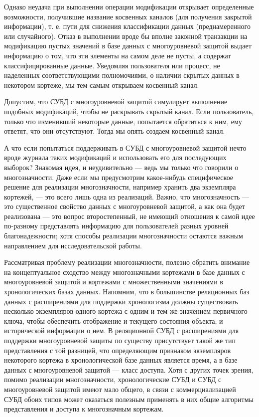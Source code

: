Однако неудача при выполнении операции модификации открывает определенные возможности, получившие название косвенных каналов (для получения закрытой информации), т. е. пути для снижения классификации данных (преднамеренного или случайного). Отказ в выполнении вроде бы вполне законной транзакции на модификацию пустых значений в базе данных с многоуровневой защитой выдает информацию о том, что эти элементы на самом деле не пусты, а содержат классифицированные данные. Уведомляя пользователя или процесс, не наделенных соответствующими полномочиями, о наличии скрытых данных в некотором кортеже, мы тем самым открываем косвенный канал.

Допустим, что СУБД с многоуровневой защитой симулирует выполнение подобных модификаций, чтобы не раскрывать скрытый канал. Если пользователь, только что изменивший некоторые данные, попытается обратиться к ним, ему ответят, что они отсутствуют. Тогда мы опять создаем косвенный канал.

А что если попытаться поддерживать в СУБД с многоуровневой защитой нечто вроде журнала таких модификаций и использовать его для последующих выборок? Знакомая идея, и неудивительно --- ведь мы только что говорили о многозначности. Даже если мы предусмотрим какое-нибудь специфическое решение для реализации многозначности, например хранить два экземпляра кортежей, --- это всего лишь одна из реализаций. Важно, что многозначность --- это существенное свойство данных с многоуровневой защитой, а как она будет реализована --- это вопрос второстепенный, не имеющий отношения к самой идее по-разному представлять информацию для пользователей разных уровней благонадежности; хотя способы реализации многозначности остаются важным направлением для исследовательской работы.

Рассматривая проблему реализации многозначности, полезно обратить внимание на концептуальное сходство между многозначными кортежами в базе данных с многоуровневой защитой и кортежами с множественными значениями в хронологических базах данных. Напомним, что в большинстве реляционных баз данных с расширениями для поддержки хронологизма должны существовать несколько экземпляров одного кортежа с одним и тем же значением первичного ключа, чтобы обеспечить отображение и текущего состояния объекта, и исторической информации о нем. В реляционной СУБД с расширениями для поддержки многоуровневой защиты по существу присутствует такой же тип представления с той разницей, что определяющим признаком экземпляров некоторого кортежа в хронологической базе данных является время, а в базе данных с многоуровневой защитой --- класс доступа. Хотя с других точек зрения, помимо реализации многозначности, хронологические СУБД и СУБД с многоуровневой защитой имеют мало общего, в связи с коммерциализацией СУБД обоих типов может оказаться полезным применять в них общие алгоритмы представления и доступа к многозначным кортежам.

